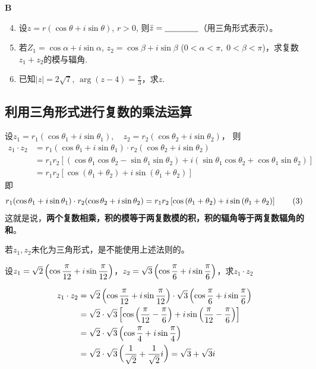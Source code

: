 \begin{center}
    \bfseries B
\end{center}

\begin{enumerate}\setcounter{enumi}{3}
    \item 设$z=r(\cos\theta +i\sin\theta )$, $r>0$, 
    则$\bar z=\underline{\qquad}\underline{\qquad}$（用三角形式表示）。
    \item  若$Z_1=\cos\alpha+i\sin\alpha$, $z_2=\cos\beta+i\sin\beta$ ($0<\alpha<\pi,\; 0<\beta<\pi$)，求复数$z_1+z_2$的模与辐角.
    \item 已知$|z|=2\sqrt{7}$, $\arg(z-4)=\frac{\pi}{3}$，求$z$.
\end{enumerate}

\subsection{利用三角形式进行复数的乘法运算}
设$z_1=r_1(\cos\theta_1+i\sin\theta_1),\quad z_2=r_2(\cos\theta_2+i\sin\theta_2)$，
则
\[\begin{split}
    z_1\cdot z_2&=r_1(\cos\theta_1+i\sin\theta_1)\cdot r_2(\cos\theta_2+i\sin\theta_2)\\
    &=r_1r_2[(\cos\theta_1\cos\theta_2-\sin\theta_1\sin\theta_2)+i(\sin\theta_1
    \cos\theta_2+\cos\theta_1\sin\theta_2)]\\
    &=r_1r_2[\cos(\theta_1+\theta_2)+i\sin(\theta_1+\theta_2)]        
\end{split}\]
即
\begin{equation}
r_1(\cos\theta_1+i\sin\theta_1)\cdot r_2(\cos\theta_2+i\sin\theta_2)=r_1r_2\left[\cos\left(\theta_1+\theta_2\right)+i\sin\left(\theta_1+\theta_2\right)\right]\tag{3}
\end{equation}
这就是说，\textbf{两个复数相乘，积的模等于两复数模的积，积的辐角等于两复数辐角的和}。

\begin{remark}
    若$z_1,z_2$未化为三角形式，是不能使用上述法则的。
\end{remark}


\begin{example}
设$z_1=\sqrt{2}\left(\cos\dfrac{\pi}{12}+i\sin\dfrac{\pi}{12}\right)$，$z_2=\sqrt{3}\left(\cos\dfrac{\pi}{6}+i\sin\dfrac{\pi}{6}\right)$，求$z_1\cdot z_2$
\end{example}

\begin{solution}
\[\begin{split}
z_1\cdot z_2&=\sqrt{2}\left(\cos\dfrac{\pi}{12}+i\sin\dfrac{\pi}{12}\right)\cdot \sqrt{3}\left(\cos\dfrac{\pi}{6}+i\sin\dfrac{\pi}{6}\right)\\
&=\sqrt{2}\cdot \sqrt{3}\left[\cos\left(\dfrac{\pi}{12}-\dfrac{\pi}{6}\right)+i\sin\left(\dfrac{\pi}{12}-\dfrac{\pi}{6}\right)\right]\\
&=\sqrt{2}\cdot \sqrt{3}\left(\cos\dfrac{\pi}{4}+i\sin\dfrac{\pi}{4}\right)\\
&=\sqrt{2}\cdot \sqrt{3}\left(\dfrac{1}{\sqrt{2}}+\dfrac{1}{\sqrt{2}}i\right)=\sqrt{3}+\sqrt{3}i
\end{split}\]
\end{solution}

